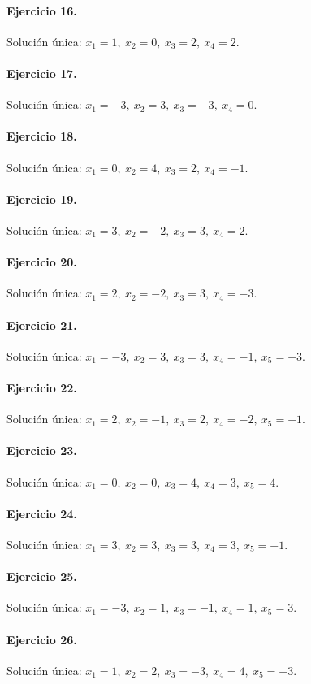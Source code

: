 \documentclass[12pt]{article}
\theoremstyle{remark}
\begin{document}
\paragraph{Ejercicio 16.} Solución única: \(x_{1}=1,\ x_{2}=0,\ x_{3}=2,\ x_{4}=2\).
\paragraph{Ejercicio 17.} Solución única: \(x_{1}=-3,\ x_{2}=3,\ x_{3}=-3,\ x_{4}=0\).
\paragraph{Ejercicio 18.} Solución única: \(x_{1}=0,\ x_{2}=4,\ x_{3}=2,\ x_{4}=-1\).
\paragraph{Ejercicio 19.} Solución única: \(x_{1}=3,\ x_{2}=-2,\ x_{3}=3,\ x_{4}=2\).
\paragraph{Ejercicio 20.} Solución única: \(x_{1}=2,\ x_{2}=-2,\ x_{3}=3,\ x_{4}=-3\).
\paragraph{Ejercicio 21.} Solución única: \(x_{1}=-3,\ x_{2}=3,\ x_{3}=3,\ x_{4}=-1,\ x_{5}=-3\).
\paragraph{Ejercicio 22.} Solución única: \(x_{1}=2,\ x_{2}=-1,\ x_{3}=2,\ x_{4}=-2,\ x_{5}=-1\).
\paragraph{Ejercicio 23.} Solución única: \(x_{1}=0,\ x_{2}=0,\ x_{3}=4,\ x_{4}=3,\ x_{5}=4\).
\paragraph{Ejercicio 24.} Solución única: \(x_{1}=3,\ x_{2}=3,\ x_{3}=3,\ x_{4}=3,\ x_{5}=-1\).
\paragraph{Ejercicio 25.} Solución única: \(x_{1}=-3,\ x_{2}=1,\ x_{3}=-1,\ x_{4}=1,\ x_{5}=3\).
\paragraph{Ejercicio 26.} Solución única: \(x_{1}=1,\ x_{2}=2,\ x_{3}=-3,\ x_{4}=4,\ x_{5}=-3\).
\end{document}
